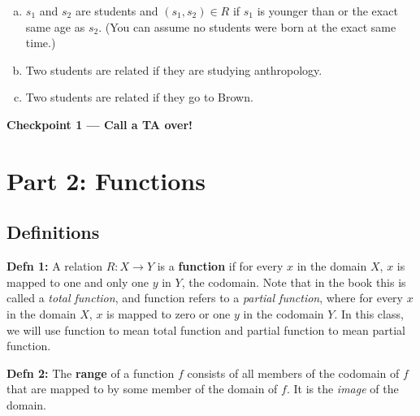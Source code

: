 \documentclass[12pt,letterpaper]{article}
\newif\ifsol
\newcommand{\solu}[2]{ \begin{mdframed} \ifsol #2 \else \vspace{#1} \fi \end{mdframed} }
\begin{document}
\begin{enumerate}[1.]
\begin{enumerate}[a.]
{				However, not antisymmetric.}


			\item$s_1$ and $s_2$ are students and $(s_1,s_2) \in R$ if $s_1$ is younger than or the exact same age as $s_2$. (You can assume no students were born at the exact same time.)

				\solu{4cm}{Transitive and anti-symmetric and reflexive, but not symmetric.}

		\item Two students are related if they are studying anthropology.
		
				\solu{4cm}{Symmetric and transitive but not reflexive or anti-symmetric.}


	  	\item Two students are related if they go to Brown.


				\solu{4cm}{Reflexive, symmetric, and transitive, but not antisymmetric. Therefore equivalence relation. One equivalence class which consists of all students at Brown.}
		\end{enumerate}
    
\end{enumerate}

\textbf{Checkpoint 1 — Call a TA over!}

\newpage

	\section*{Part 2: Functions}

      \subsection*{Definitions}

      \textbf{Defn 1:} A relation $R: X\rightarrow Y$ is a \textbf{function} if for every $x$ in the domain $X$, $x$ is mapped to one and only one $y$ in $Y$, the codomain. Note that in the book this is called a \textit{total function}, and function refers to a \textit{partial function}, where for every $x$ in the domain $X$, $x$ is mapped to zero or one $y$ in the codomain $Y$. In this class, we will use function to mean total function and partial function to mean partial function.

      \textbf{Defn 2:} The \textbf{range} of a function $f$ consists of all members of the codomain of $f$ that are mapped to by some member of the domain of $f$. It is the \emph{image} of the domain.
\end{document}
